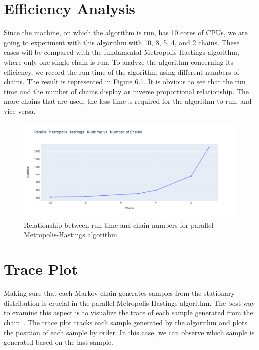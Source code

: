 \section{Efficiency Analysis}
Since the machine, on which the algorithm is run, has 10 cores of CPUs, we are going to experiment with this algorithm with 10, 8, 5, 4, and 2 chains. These cases will be compared with the fundamental Metropolis-Hastings algorithm, where only one single chain is run. To analyze the algorithm concerning its efficiency, we record the run time of the algorithm using different numbers of chains. The result is represented in Figure 6.1. It is obvious to see that the run time and the number of chains display an inverse proportional relationship. The more chains that are used, the less time is required for the algorithm to run, and vice versa.

\begin{figure}[H]
    \centering
    \includegraphics[width=1\textwidth]{figures/parallel_mh/runtime.png}
    \captionsetup{width=.8\textwidth}
    \caption{Relationship between run time and chain numbers for parallel Metropolis-Hastings algorithm}
    \label{fig:enter-label}
\end{figure}

\section{Trace Plot}
Making sure that each Markov chain generates samples from the stationary distribution is crucial in the parallel Metropolis-Hastings algorithm. The best way to examine this aspect is to visualize the trace of each sample generated from the chain~\cite{mcmc_practice}. The trace plot tracks each sample generated by the algorithm and plots the position of each sample by order. In this case, we can observe which sample is generated based on the last sample.

